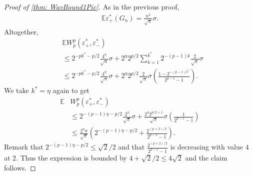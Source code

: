 \documentclass{article}
\theoremstyle{plain}
\theoremstyle{definition}
\theoremstyle{remark}
\begin{document}
\begin{proof}[Proof of \cref{thm: WavBound1Pic}]
 As in the previous proof, 
 \begin{align}
     \mathbb{E} \varepsilon^*_+(G_n)
     =
    \frac{n^2}{\sqrt{\pi}}\sigma.
 \end{align}
 Altogether, 
\begin{align}
    &\mathbb{E} W_p^p(\varepsilon^*_+, \varepsilon^*_-)
    \\
    &\le 2^{-pk^*-p/2} \frac{4^{\eta}}{\sqrt{\pi}}\sigma + 2^\eta 2^{p/2} \sum_{k=1}^{k^*} 2^{-(p-1)k} \frac{2}{\sqrt{\pi}} \sigma \nonumber \\
    &\le 2^{-pk^*-p/2} \frac{4^{\eta}}{\sqrt{\pi}}\sigma + 2^\eta 2^{p/2} \frac{2}{\sqrt{\pi}} \sigma \left( \frac{1- 2^{-(p-1)k^*}}{2^{p-1}-1} \right). \nonumber
\end{align}
 We take \(k^* = \eta\) again to get
\begin{align}
    \mathbb{E} & W_p^p(\varepsilon^*_+, \varepsilon^*_-)  \\
    &\le 2^{-(p-1)\eta -p/2} \frac{2^{\eta}}{\sqrt{\pi}}\sigma + \frac{2^{\eta} 2^{p/2 + 1}}{\sqrt{\pi}}
    \sigma \left( \frac{1}{2^{p-1}-1} \right) \nonumber \\
    &\le \frac{2^\eta \sigma}{\sqrt{\pi}} \left( 2^{-(p-1)\eta -p/2} + \frac{2^{(p+2)/2}}{2^{p-1}-1} \right). \nonumber
\end{align}
Remark that $2^{-(p-1)\eta -p/2} \le \sqrt{2}/2$ and that $\frac{2^{(p+2)/2}}{2^{p-1}-1}$ is decreasing with value $4$ at 2. Thus the expression is bounded by $4 + \sqrt{2}/2\le 4\sqrt2$ and the claim follows.
\end{proof}
\end{document}
